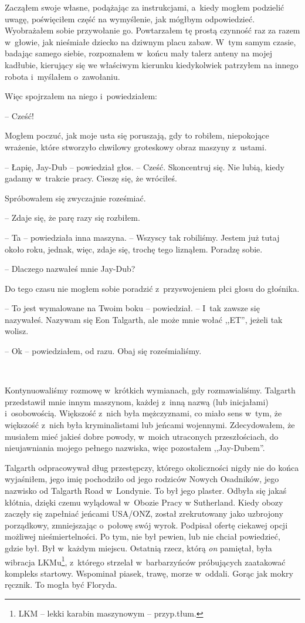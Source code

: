 \documentclass[oneside,polish,11pt,sfheadings]{mwbk}
\begin{document}
Zacząłem swoje własne, podążając za instrukcjami, a~kiedy mogłem
podzielić uwagę, poświęciłem część na wymyślenie, jak mógłbym
odpowiedzieć. Wyobrażałem sobie przywołanie go. Powtarzałem tę prostą
czynność raz za razem w~głowie, jak nieśmiałe dziecko na dziwnym placu
zabaw. W~tym samym czasie, badając samego siebie, rozpoznałem w~końcu
mały talerz anteny na mojej kadłubie, kierujący się we właściwym kierunku
kiedykolwiek patrzyłem na innego robota i~myślałem o~zawołaniu.

Więc spojrzałem na niego i~powiedziałem: 

-- Cześć! 

Mogłem poczuć, jak moje usta się poruszają, gdy to robiłem, niepokojące wrażenie, które
stworzyło chwilowy groteskowy obraz maszyny z~ustami.

-- Łapię, Jay-Dub -- powiedział głos. -- Cześć. Skoncentruj się. Nie lubią,
kiedy gadamy w~trakcie pracy. Cieszę się, że wróciłeś.

Spróbowałem się zwyczajnie roześmiać.

-- Zdaje się, że parę razy się rozbiłem.

-- Ta -- powiedziała inna maszyna. -- Wszyscy tak robiliśmy. Jestem już
tutaj około roku, jednak, więc, zdaje się, trochę tego liznąłem. Poradzę
sobie.

-- Dlaczego nazwałeś mnie Jay-Dub?

Do tego czasu nie mogłem sobie poradzić z~przyswojeniem płci głosu do
głośnika. 

-- To jest wymalowane na Twoim boku -- powiedział. -- I~tak
zawsze się nazywałeś. Nazywam się Eon Talgarth, ale może mnie wołać
,,ET'', jeżeli tak wolisz.

-- Ok -- powiedziałem, od razu. Obaj się roześmialiśmy.

~

Kontynuowaliśmy rozmowę w~krótkich wymianach, gdy rozmawialiśmy.
Talgarth przedstawił mnie innym maszynom, każdej z~inną nazwą (lub
inicjałami) i~osobowością. Większość z~nich była mężczyznami, co miało
sens w~tym, że większość z~nich była kryminalistami lub jeńcami
wojennymi. Zdecydowałem, że musiałem mieć jakieś dobre powody, w~moich
utraconych przeszłościach, do nieujawniania mojego pełnego nazwiska,
więc pozostałem ,,Jay-Dubem''.

Talgarth odpracowywał dług przestępczy, którego okoliczności nigdy nie
do końca wyjaśniłem, jego imię pochodziło od jego rodziców Nowych
Osadników, jego nazwisko od Talgarth Road w~Londynie. To był jego
plaster. Odbyła się jakaś kłótnia, dzięki czemu wylądował w~Obozie Pracy
w Sutherland. Kiedy obozy zaczęły się zapełniać jeńcami USA/ONZ, został
zrekrutowany jako uzbrojony porządkowy, zmniejszając o~połowę swój
wyrok. Podpisał ofertę ciekawej opcji możliwej nieśmiertelności. Po tym,
nie był pewien, lub nie chciał powiedzieć, gdzie był. Był w~każdym
miejscu. Ostatnią rzecz, którą \emph{on} pamiętał, była wibracja
LKMu\footnote{ LKM -- lekki karabin maszynowym  -- przyp.tłum.}, z~którego
strzelał w~barbarzyńców próbujących zaatakować kompleks startowy.
Wspominał piasek, trawę, morze w~oddali. Gorąc jak mokry ręcznik. To
mogła być Floryda.
\end{document}
